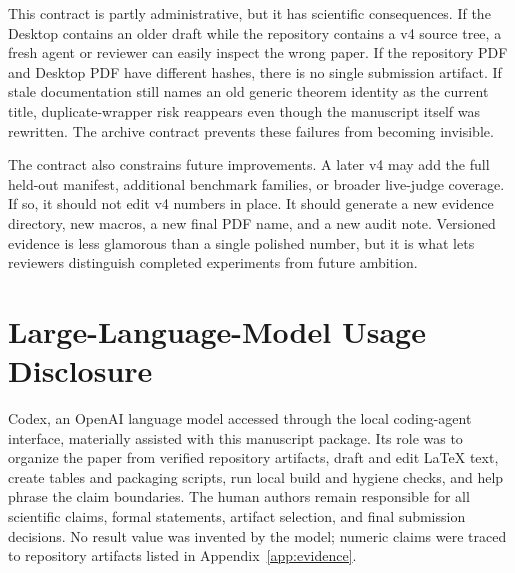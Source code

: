 This contract is partly administrative, but it has scientific consequences.
If the Desktop contains an older draft while the repository contains a v4
source tree, a fresh agent or reviewer can easily inspect the wrong paper. If
the repository PDF and Desktop PDF have different hashes, there is no single
submission artifact. If stale documentation still names an old generic theorem
identity as the current title, duplicate-wrapper risk reappears even though the
manuscript itself was rewritten. The archive contract prevents these failures
from becoming invisible.

The contract also constrains future improvements. A later v4 may add the full
held-out manifest, additional benchmark families, or broader live-judge
coverage. If so, it should not edit v4 numbers in place. It should generate a
new evidence directory, new macros, a new final PDF name, and a new audit note.
Versioned evidence is less glamorous than a single polished number, but it is
what lets reviewers distinguish completed experiments from future ambition.

\section{Large-Language-Model Usage Disclosure}
\label{app:llm}

Codex, an OpenAI language model accessed through the local coding-agent
interface, materially assisted with this manuscript package. Its role was to
organize the paper from verified repository artifacts, draft and edit LaTeX
text, create tables and packaging scripts, run local build and hygiene checks,
and help phrase the claim boundaries. The human authors remain responsible for
all scientific claims, formal statements, artifact selection, and final
submission decisions. No result value was invented by the model; numeric
claims were traced to repository artifacts listed in
Appendix~\ref{app:evidence}.

